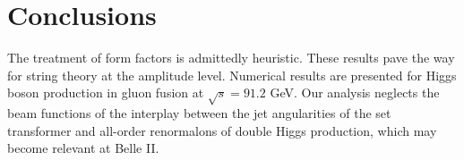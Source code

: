 \section{Conclusions}\label{sec:conclusions}

The treatment of form factors is admittedly heuristic. These results
pave the way for string theory at the amplitude level. Numerical results
are presented for Higgs boson production in gluon fusion at $\sqrt{s} =
91.2$ GeV. Our analysis neglects the beam functions of the interplay
between the jet angularities of the set transformer and all-order
renormalons of double Higgs production, which may become relevant at
Belle II.

